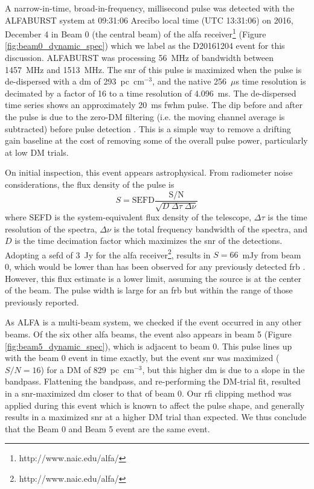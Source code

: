 \documentclass[a4paper,fleqn,usenatbib]{mnras}
\begin{document}
A narrow-in-time, broad-in-frequency, millisecond pulse was detected with the
ALFABURST system at 09:31:06 Arecibo local time (UTC 13:31:06) on 2016, December
4 in Beam 0 (the central beam) of the \gls{alfa}
receiver\footnote{http://www.naic.edu/alfa/} (Figure
\ref{fig:beam0_dynamic_spec}) which we label as the D20161204 event for this
discussion. ALFABURST was processing 56~MHz of bandwidth between 1457~MHz and
1513~MHz. The \gls{snr} of this pulse is maximized when the pulse is
de-dispersed with a \gls{dm} of 293~pc~cm$^{-3}$, and the native 256~$\mu$s time
resolution is decimated by a factor of 16 to a time resolution of 4.096~ms. The
de-dispersed time series shows an approximately 20~ms \gls{fwhm} pulse.  The dip
before and after the pulse is due to the zero-DM filtering (i.e. the moving
channel average is subtracted) before pulse detection
\citep{2009MNRAS.395..410E}. This is a simple way to remove a drifting gain
baseline at the cost of removing some of the overall pulse power, particularly
at low DM trials.

On initial inspection, this event appears astrophysical. From radiometer noise
considerations, the flux density of the pulse is
%
\begin{equation}
S = \textrm{SEFD} \frac{\textrm{S/N}}{\sqrt{D \; \Delta \tau \;
\Delta \nu}}
\end{equation}
%
where SEFD is the system-equivalent flux density of the telescope, $\Delta \tau$
is the time resolution of the spectra, $\Delta \nu$ is the total frequency
bandwidth of the spectra, and $D$ is the time decimation factor which maximizes
the \gls{snr} of the detections.  Adopting a \gls{sefd} of 3~Jy for the
\gls{alfa} receiver\footnote{http://www.naic.edu/alfa/},  results in \mbox{$S =
66$}~mJy from beam 0, which would be lower than has been observed for any
previously detected \gls{frb} \citep{2016PASA...33...45P}.  However, this flux
estimate is a lower limit, assuming the source is at the center of the beam. The
pulse width is large for an \gls{frb} but within the range of those previously
reported.

As ALFA is a multi-beam system, we checked if the event occurred in any other
beams. Of the six other \gls{alfa} beams, the event also appears in beam 5
(Figure \ref{fig:beam5_dynamic_spec}), which is adjacent to beam 0.  This pulse
lines up with the beam 0 event in time exactly, but the event \gls{snr} was
maximized ($S/N=16$) for a DM of 829~pc~cm$^{-3}$, but this higher \gls{dm} is
due to a slope in the bandpass. Flattening the bandpass, and re-performing the
DM-trial fit, resulted in a \gls{snr}-maximized \gls{dm} closer to that of beam
0.  Our \gls{rfi} clipping method was applied during this event which is known
to affect the pulse shape, and generally results in a maximized \gls{snr} at a
higher DM trial than expected.  We thus conclude that the Beam 0 and Beam 5
event are the same event.
\end{document}
